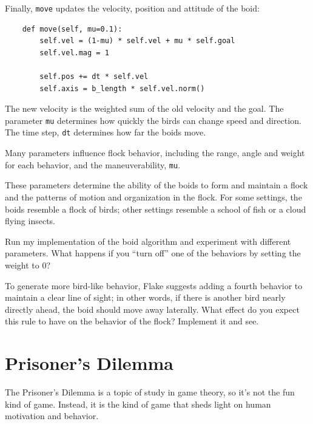 \documentclass[10pt]{book}
\begin{document}
Finally, {\tt move} updates the velocity, position and
attitude of the boid:

\begin{verbatim}
    def move(self, mu=0.1):
        self.vel = (1-mu) * self.vel + mu * self.goal
        self.vel.mag = 1

        self.pos += dt * self.vel
        self.axis = b_length * self.vel.norm()
\end{verbatim}

The new velocity is the weighted sum of the old velocity
and the goal.  The parameter {\tt mu} determines how quickly
the birds can change speed and direction.  The time step, {\tt dt}
determines how far the boids move.

Many parameters influence flock behavior, including the range, angle
and weight for each behavior, and the maneuverability, {\tt mu}.

These parameters determine the ability of the boids to form and
maintain a flock and the patterns of motion and organization in the
flock.  For some settings, the boids resemble a flock of birds; other
settings resemble a school of fish or a cloud flying insects.

\begin{exercise}


Run my implementation of the boid algorithm and experiment with
different parameters.  What happens if you ``turn off'' one
of the behaviors by setting the weight to 0?

To generate more bird-like behavior,
Flake suggests adding a fourth behavior to maintain a clear
line of sight; in other words, if there is another bird nearly
directly ahead, the boid should move away laterally.  What effect
do you expect this rule to have on the behavior of the flock?
Implement it and see.

\end{exercise}


\section{Prisoner's Dilemma}
\label{prisoners}

The Prisoner's Dilemma is a topic of study in game theory, so
it's not the fun kind of game.  Instead, it is the kind of game
that sheds light on human motivation and behavior.
\end{document}

